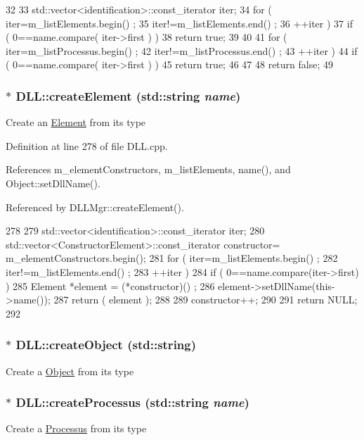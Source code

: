 \begin{DoxyCode}
32                                           {
33   std::vector<identification>::const_iterator iter;
34   for ( iter=m_listElements.begin() ;
35         iter!=m_listElements.end() ;
36         ++iter ) {
37     if ( 0==name.compare( iter->first ) ){
38       return true;
39     }
40   }
41   for ( iter=m_listProcessus.begin() ;
42         iter!=m_listProcessus.end() ;
43         ++iter ) {
44     if ( 0==name.compare( iter->first ) ){
45       return true;
46     }
47   }
48   return false;
49 }
\end{DoxyCode}
\hypertarget{classDLL_a20cd236b93830729cad8fcec092e5e18}{
\subsubsection[{createElement}]{ $\ast$ DLL::createElement (std::string {\em name})}}
\label{classDLL_a20cd236b93830729cad8fcec092e5e18}
Create an \hyperlink{classElement}{Element} from its type 

Definition at line 278 of file DLL.cpp.

References m\_\-elementConstructors, m\_\-listElements, name(), and Object::setDllName().

Referenced by DLLMgr::createElement().


\begin{DoxyCode}
278                                              {
279   std::vector<identification>::const_iterator iter;
280   std::vector<ConstructorElement>::const_iterator constructor=
      m_elementConstructors.begin();
281   for ( iter=m_listElements.begin() ;
282         iter!=m_listElements.end() ;
283         ++iter ) {
284     if ( 0==name.compare(iter->first) ){
285       Element *element = (*constructor)() ;
286       element->setDllName(this->name());
287       return ( element );
288     }
289     constructor++;
290   }
291   return NULL;
292 }
\end{DoxyCode}
\hypertarget{classDLL_aab0ac14c9ae23fe6cb9aadb2cbc87424}{
\subsubsection[{createObject}]{$\ast$ DLL::createObject (std::string)}}
\label{classDLL_aab0ac14c9ae23fe6cb9aadb2cbc87424}
Create a \hyperlink{classObject}{Object} from its type \hypertarget{classDLL_a9136bcd5e5ca7894bd337241803735c3}{
\subsubsection[{createProcessus}]{ $\ast$ DLL::createProcessus (std::string {\em name})}}
\label{classDLL_a9136bcd5e5ca7894bd337241803735c3}
Create a \hyperlink{classProcessus}{Processus} from its type 

